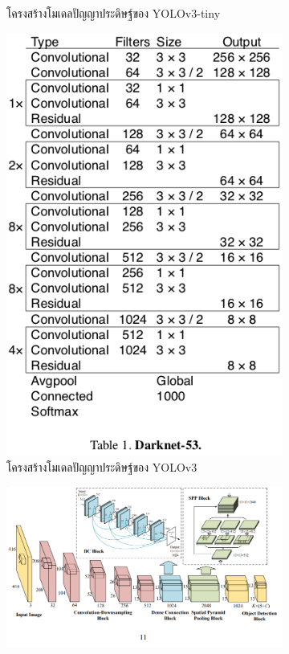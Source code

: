 \begin{figure}[!ht]
\begin{subfigure}[b]{0.2\textwidth}
	 \caption{โครงสร้างโมเดลปัญญาประดิษฐ์ของ YOLOv3-tiny}
        \label{fig:tiny}
    \end{subfigure}
    \begin{subfigure}[b]{0.3\textwidth}
        \centering
        \includegraphics[width=\textwidth]{chapter2/images/yolo_darknet.png}
	 \caption{โครงสร้างโมเดลปัญญาประดิษฐ์ของ YOLOv3}
       \label{fig:darknet}
    \end{subfigure}
    \begin{subfigure}[b]{0.5\textwidth}
        \centering
        \includegraphics[width=\textwidth]{chapter2/images/yolo_spp.png}

\end{subfigure}
\end{figure}
